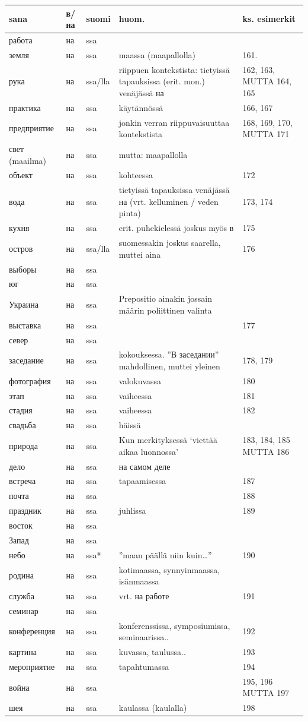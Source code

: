 \documentclass[]{scrartcl}
\begin{document}
\begin{longtable}[c]{@{}lllll@{}}
\toprule
sana & в/на & suomi & huom. & ks. esimerkit\tabularnewline
\midrule
\endhead
работа & на & ssa & &\tabularnewline
земля & на & ssa & maassa (maapallolla) & 161.\tabularnewline
рука & на & ssa/lla & riippuen kontekstista: tietyissä tapauksissa
(erit. mon.) venäjässä на & 162, 163, MUTTA 164, 165\tabularnewline
практика & на & ssa & käytännössä & 166, 167\tabularnewline
предприятие & на & ssa & jonkin verran riippuvaisuuttaa kontekstista &
168, 169, 170, MUTTA 171\tabularnewline
свет (maailma) & на & ssa & mutta: maapallolla &\tabularnewline
объект & на & ssa & kohteessa & 172\tabularnewline
вода & на & ssa & tietyissä tapauksissa venäjässä на (vrt. kelluminen /
veden pinta) & 173, 174\tabularnewline
кухня & на & ssa & erit. puhekielessä joskus myös в & 175\tabularnewline
остров & на & ssa/lla & suomessakin joskus saarella, muttei aina &
176\tabularnewline
выборы & на & ssa & &\tabularnewline
юг & на & ssa & &\tabularnewline
Украина & на & ssa & Prepositio ainakin jossain määrin poliittinen
valinta &\tabularnewline
выставка & на & ssa & & 177\tabularnewline
север & на & ssa & &\tabularnewline
заседание & на & ssa & kokouksessa. ''В заседании'' mahdollinen, muttei
yleinen & 178, 179\tabularnewline
фотография & на & ssa & valokuvassa & 180\tabularnewline
этап & на & ssa & vaiheessa & 181\tabularnewline
стадия & на & ssa & vaiheessa & 182\tabularnewline
свадьба & на & ssa & häissä &\tabularnewline
природа & на & ssa & Kun merkityksessä `viettää aikaa luonnossa' & 183,
184, 185 MUTTA 186\tabularnewline
дело & на & ssa & на самом деле &\tabularnewline
встреча & на & ssa & tapaamisessa & 187\tabularnewline
почта & на & ssa & & 188\tabularnewline
праздник & на & ssa & juhlissa & 189\tabularnewline
восток & на & ssa & &\tabularnewline
Запад & на & ssa & &\tabularnewline
небо & на & ssa* & ''maan päällä niin kuin\ldots{}'' &
190\tabularnewline
родина & на & ssa & kotimaassa, synnyinmaassa, isänmaassa
&\tabularnewline
служба & на & ssa & vrt. на работе & 191\tabularnewline
семинар & на & ssa & &\tabularnewline
конференция & на & ssa & konferenssissa, symposiumissa, seminaarissa.. &
192\tabularnewline
картина & на & ssa & kuvassa, taulussa.. & 193\tabularnewline
мероприятие & на & ssa & tapahtumassa & 194\tabularnewline
война & на & ssa & & 195, 196 MUTTA 197\tabularnewline
шея & на & ssa & kaulassa (kaulalla) & 198\tabularnewline
\bottomrule
\end{longtable}
\end{document}
